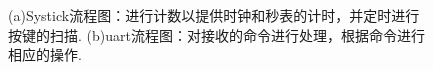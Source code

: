 \documentclass[12pt, a4paper, oneside]{ctexart}
\begin{document}
    \begin{figure}[t]
        \centering
        \hfil
        \caption{(a)Systick流程图：进行计数以提供时钟和秒表的计时，并定时进行按键的扫描.
        (b)uart流程图：对接收的命令进行处理，根据命令进行相应的操作.} 

    \end{figure}
\end{document}
